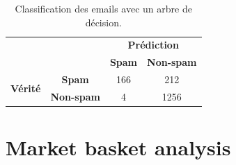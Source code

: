 \documentclass[a4paper]{article}
\begin{document}
\begin{table}[H]
	\centering
	\begin{tabular}{cccl}
	\def\arraystretch{2.0}
	& \textbf{}
	& \multicolumn{2}{c}{\textbf{Prédiction}}\\ \cline{3-4} 
	& \multicolumn{1}{c|}{}
	& \multicolumn{1}{c|}{\textbf{Spam}}
	& \multicolumn{1}{c|}{\textbf{Non-spam}} \\ \cline{2-4} 
	\multicolumn{1}{c|}{\multirow{2}{*}{\textbf{Vérité}}}
	& \multicolumn{1}{c|}{\textbf{Spam}}
	& \multicolumn{1}{c|}{166}
	& \multicolumn{1}{c|}{212}\\ \cline{2-4} 
	\multicolumn{1}{c|}{}
	& \multicolumn{1}{c|}{\textbf{Non-spam}} & \multicolumn{1}{c|}{4}
	& \multicolumn{1}{c|}{1256}\\ \cline{2-4} 
	\end{tabular}
	\caption{Classification des emails avec un arbre de décision.}
\end{table}


\pagebreak
\section{Market basket analysis}
\end{document}
